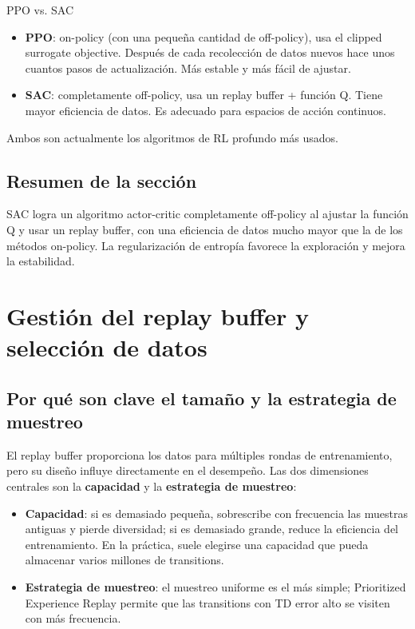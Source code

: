 \documentclass[a4paper]{article}
\begin{document}
\begin{importantbox}{PPO vs. SAC}
\begin{itemize}
    \item \textbf{PPO}: on-policy (con una pequeña cantidad de off-policy), usa el clipped surrogate objective. Después de cada recolección de datos nuevos hace unos cuantos pasos de actualización. Más estable y más fácil de ajustar.
    \item \textbf{SAC}: completamente off-policy, usa un replay buffer + función Q. Tiene mayor eficiencia de datos. Es adecuado para espacios de acción continuos.
\end{itemize}
Ambos son actualmente los algoritmos de RL profundo más usados.
\end{importantbox}

\subsection{Resumen de la sección}

SAC logra un algoritmo actor-critic completamente off-policy al ajustar la función Q y usar un replay buffer, con una eficiencia de datos mucho mayor que la de los métodos on-policy. La regularización de entropía favorece la exploración y mejora la estabilidad.

\section{Gestión del replay buffer y selección de datos}

\subsection{Por qué son clave el tamaño y la estrategia de muestreo}

El replay buffer proporciona los datos para múltiples rondas de entrenamiento, pero su diseño influye directamente en el desempeño. Las dos dimensiones centrales son la \textbf{capacidad} y la \textbf{estrategia de muestreo}:

\begin{itemize}
    \item \textbf{Capacidad}: si es demasiado pequeña, sobrescribe con frecuencia las muestras antiguas y pierde diversidad; si es demasiado grande, reduce la eficiencia del entrenamiento. En la práctica, suele elegirse una capacidad que pueda almacenar varios millones de transitions.
    \item \textbf{Estrategia de muestreo}: el muestreo uniforme es el más simple; Prioritized Experience Replay permite que las transitions con TD error alto se visiten con más frecuencia.
\end{itemize}
\end{document}
